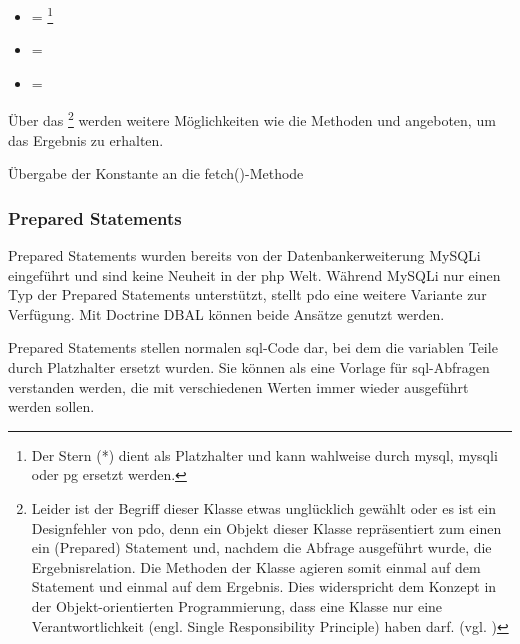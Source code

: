 \begin{itemize}
	\item {} = \footnote{Der Stern (*) dient als Platzhalter und kann wahlweise durch mysql, mysqli oder pg ersetzt werden.}
	\item {} = 
	\item {} = 
\end{itemize}

Über das \footnote{Leider ist der Begriff dieser Klasse etwas unglücklich gewählt oder es ist ein Designfehler von \gls{pdo}, denn ein Objekt dieser Klasse repräsentiert zum einen ein (Prepared) Statement und, nachdem die Abfrage ausgeführt wurde, die Ergebnisrelation. Die Methoden der Klasse agieren somit einmal auf dem Statement und einmal auf dem Ergebnis. Dies widerspricht dem Konzept in der Objekt-orientierten Programmierung, dass eine Klasse nur eine Verantwortlichkeit (engl. Single Responsibility Principle) haben darf. (vgl. \cite[S. 181]{book:martinCleanCode2008})} werden weitere Möglichkeiten wie die Methoden  und  angeboten, um das Ergebnis zu erhalten.

\begin{listing}[H]
\caption{Übergabe der Konstante an die fetch()-Methode}
\label{lst:fetctWithWhileLoop}
\end{listing}

\subsubsection{Prepared Statements}
\label{basics:doctrine:subsubsec:preparedStatements}
Prepared Statements wurden bereits von der Datenbankerweiterung MySQLi eingeführt und sind keine Neuheit in der \gls{php} Welt. Während MySQLi nur einen Typ der Prepared Statements unterstützt, stellt \gls{pdo} eine weitere Variante zur Verfügung. Mit Doctrine DBAL können beide Ansätze genutzt werden.

Prepared Statements stellen normalen \gls{sql}-Code dar, bei dem die variablen Teile durch Platzhalter ersetzt wurden. Sie können als eine Vorlage für \gls{sql}-Abfragen verstanden werden, die mit verschiedenen Werten immer wieder ausgeführt werden sollen.

